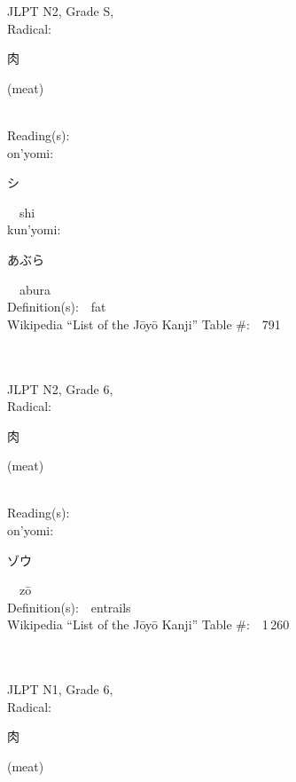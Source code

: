 \begin{multicols}{2}
{JLPT N2, Grade S, \\Radical:\ \ {\begin{CJK}{UTF8}{min} 肉 \end{CJK}} (meat) } \\
Reading(s):\ \ \\
{\hspace*{1em}}on'yomi:\ \ \\
{\hspace*{2em}}{\begin{CJK}{UTF8}{min} シ \end{CJK}}\ \ shi\ \ \\
{\hspace*{1em}}kun'yomi:\ \ \\
{\hspace*{2em}}{\begin{CJK}{UTF8}{min} あぶら \end{CJK}}\ \ abura\ \ \\
Definition(s):\ \ fat \\
Wikipedia ``List of the J\=oy\=o Kanji'' Table \#:\ \ 791 \\
\ \ \\
{\fontsize{34pt}{40pt}  }\ \ \\  %
{JLPT N2, Grade 6, \\Radical:\ \ {\begin{CJK}{UTF8}{min} 肉 \end{CJK}} (meat) } \\
Reading(s):\ \ \\
{\hspace*{1em}}on'yomi:\ \ \\
{\hspace*{2em}}{\begin{CJK}{UTF8}{min} ゾウ \end{CJK}}\ \ z\=o\ \ \\
Definition(s):\ \ entrails \\
Wikipedia ``List of the J\=oy\=o Kanji'' Table \#:\ \ 1\,260 \\
\ \ \\
{\fontsize{34pt}{40pt}  }\ \ \\  %
{JLPT N1, Grade 6, \\Radical:\ \ {\begin{CJK}{UTF8}{min} 肉 \end{CJK}} (meat) } \\

\end{multicols}
